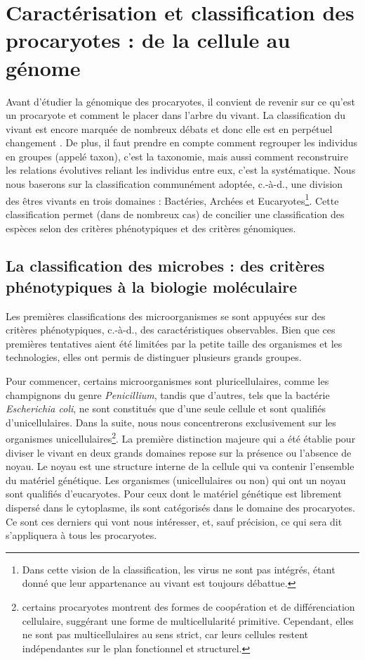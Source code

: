 \chapter{Caractérisation et classification des procaryotes : de la cellule au génome}

Avant d'étudier la génomique des procaryotes, il convient de revenir sur ce qu'est un procaryote et comment le placer dans l'arbre du vivant. La classification du vivant est encore marquée de nombreux débats et donc elle est en perpétuel changement \cite{chun_integrating_2014}\cite{adl_revisions_2019}. De plus, il faut prendre en compte comment regrouper les individus en groupes (appelé taxon), c'est la taxonomie, mais aussi comment reconstruire les relations évolutives reliant les individus entre eux, c'est la systématique. Nous nous baserons sur la classification communément adoptée, c.-à-d., une division des êtres vivants en trois domaines : Bactéries, Archées et Eucaryotes\footnote{Dans cette vision de la classification, les virus ne sont pas intégrés, étant donné que leur appartenance au vivant est toujours débattue.}. Cette classification permet (dans de nombreux cas) de concilier une classification des espèces selon des critères phénotypiques et des critères génomiques.

\section{La classification des microbes : des critères phénotypiques à la biologie moléculaire}

Les premières classifications des microorganismes se sont appuyées sur des critères phénotypiques, c.-à-d., des caractéristiques observables. Bien que ces premières tentatives aient été limitées par la petite taille des organismes et les technologies, elles ont permis de distinguer plusieurs grands groupes.

Pour commencer, certains microorganismes sont pluricellulaires, comme les champignons du genre \textit{Penicillium}, tandis que d'autres, tels que la bactérie \textit{Escherichia coli}, ne sont constitués que d'une seule cellule et sont qualifiés d'unicellulaires. Dans la suite, nous nous concentrerons exclusivement sur les organismes unicellulaires\footnote{certains procaryotes montrent des formes de coopération et de différenciation cellulaire, suggérant une forme de multicellularité primitive. Cependant, elles ne sont pas multicellulaires au sens strict, car leurs cellules restent indépendantes sur le plan fonctionnel et structurel.}. 
La première distinction majeure qui a été établie pour diviser le vivant en deux grands domaines repose sur la présence ou l'absence de noyau. Le noyau est une structure interne de la cellule qui va contenir l'ensemble du matériel génétique. Les organismes (unicellulaires ou non) qui ont un noyau sont qualifiés d'eucaryotes. Pour ceux dont le matériel génétique est librement dispersé dans le cytoplasme, ils sont catégorisés dans le domaine des procaryotes. Ce sont ces derniers qui vont nous intéresser, et, sauf précision, ce qui sera dit s'appliquera à tous les procaryotes.

